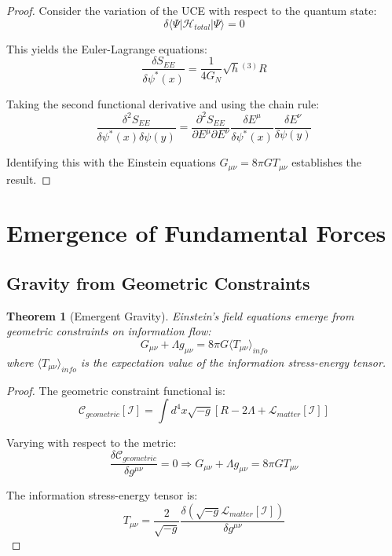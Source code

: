 \documentclass[12pt,a4paper]{article}
\newtheorem{theorem}{Theorem}[section]
\begin{document}
\begin{proof}
Consider the variation of the UCE with respect to the quantum state:
\begin{equation}
\delta \langle \Psi | \mathcal{H}_{total} | \Psi \rangle = 0
\end{equation}

This yields the Euler-Lagrange equations:
\begin{equation}
\frac{\delta S_{EE}}{\delta \psi^*(x)} = \frac{1}{4G_N} \sqrt{h} {}^{(3)}R
\end{equation}

Taking the second functional derivative and using the chain rule:
\begin{equation}
\frac{\delta^2 S_{EE}}{\delta \psi^*(x) \delta \psi(y)} = \frac{\partial^2 S_{EE}}{\partial E^\mu \partial E^\nu} \frac{\delta E^\mu}{\delta \psi^*(x)} \frac{\delta E^\nu}{\delta \psi(y)}
\end{equation}

Identifying this with the Einstein equations $G_{\mu\nu} = 8\pi G T_{\mu\nu}$ establishes the result.
\end{proof}

\section{Emergence of Fundamental Forces}

\subsection{Gravity from Geometric Constraints}

\begin{theorem}[Emergent Gravity]
Einstein's field equations emerge from geometric constraints on information flow:
\begin{equation}
G_{\mu\nu} + \Lambda g_{\mu\nu} = 8\pi G \langle T_{\mu\nu} \rangle_{info}
\end{equation}
where $\langle T_{\mu\nu} \rangle_{info}$ is the expectation value of the information stress-energy tensor.
\end{theorem}

\begin{proof}
The geometric constraint functional is:
\begin{equation}
\mathcal{C}_{geometric}[\mathcal{I}] = \int d^4x \sqrt{-g} \left[ R - 2\Lambda + \mathcal{L}_{matter}[\mathcal{I}] \right]
\end{equation}

Varying with respect to the metric:
\begin{equation}
\frac{\delta \mathcal{C}_{geometric}}{\delta g^{\mu\nu}} = 0 \Rightarrow G_{\mu\nu} + \Lambda g_{\mu\nu} = 8\pi G T_{\mu\nu}
\end{equation}

The information stress-energy tensor is:
\begin{equation}
T_{\mu\nu} = \frac{2}{\sqrt{-g}} \frac{\delta (\sqrt{-g} \mathcal{L}_{matter}[\mathcal{I}])}{\delta g^{\mu\nu}}
\end{equation}
\end{proof}
\end{document}

